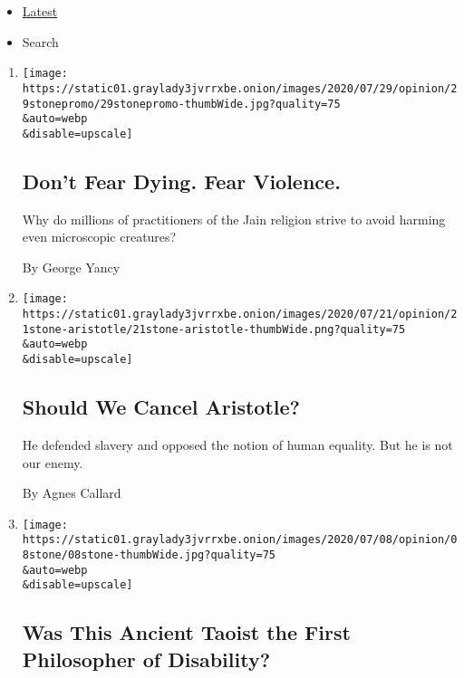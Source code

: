 \begin{itemize}
\tightlist
\item
  \protect\hyperlink{stream-panel}{Latest}
\item
  Search
\end{itemize}

\begin{enumerate}
\def\labelenumi{\arabic{enumi}.}
\item
  \href{/2020/07/29/opinion/jainism-nonviolence-death.html}{}

  \texttt{[image: https://static01.graylady3jvrrxbe.onion/images/2020/07/29/opinion/29stonepromo/29stonepromo-thumbWide.jpg?quality=75\\\&auto=webp\\\&disable=upscale]}

  \hypertarget{dont-fear-dying-fear-violence}{%
  \subsection{Don't Fear Dying. Fear
  Violence.}\label{dont-fear-dying-fear-violence}}

  Why do millions of practitioners of the Jain religion strive to avoid
  harming even microscopic creatures?

  By George Yancy
\item
  \href{/2020/07/21/opinion/should-we-cancel-aristotle.html}{}

  \texttt{[image: https://static01.graylady3jvrrxbe.onion/images/2020/07/21/opinion/21stone-aristotle/21stone-aristotle-thumbWide.png?quality=75\\\&auto=webp\\\&disable=upscale]}

  \hypertarget{should-we-cancel-aristotle}{%
  \subsection{Should We Cancel
  Aristotle?}\label{should-we-cancel-aristotle}}

  He defended slavery and opposed the notion of human equality. But he
  is not our enemy.

  By Agnes Callard
\item
  \href{/2020/07/08/opinion/disability-philosophy-zhuangzi.html}{}

  \texttt{[image: https://static01.graylady3jvrrxbe.onion/images/2020/07/08/opinion/08stone/08stone-thumbWide.jpg?quality=75\\\&auto=webp\\\&disable=upscale]}

  \hypertarget{was-this-ancient-taoist-the-first-philosopher-of-disability}{%
  \subsection{Was This Ancient Taoist the First Philosopher of
  Disability?}\label{was-this-ancient-taoist-the-first-philosopher-of-disability}}


\end{enumerate}
